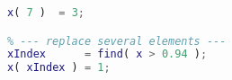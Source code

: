 \begin{lstlisting}[language=matlab]
% --- replace single element ---
x( 7 )  = 3;

% --- replace several elements ---
xIndex      = find( x > 0.94 );
x( xIndex ) = 1;

\end{lstlisting}